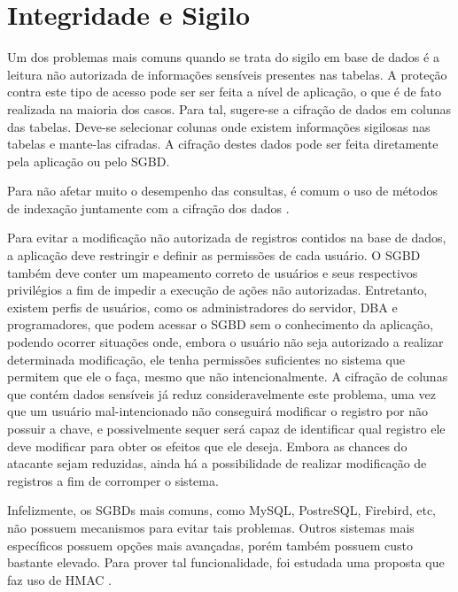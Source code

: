 \chapter{Integridade e Sigilo}


Um dos problemas mais comuns quando se trata do sigilo em base de dados \'{e} a leitura n\~{a}o autorizada de informa\c{c}\~{o}es sens\'{i}veis presentes nas tabelas.
A prote\c{c}\~{a}o contra este tipo de acesso pode ser ser feita a n\'{i}vel de aplica\c{c}\~{a}o, o que \'{e} de fato realizada na maioria dos casos.
Para tal, sugere-se a cifração de dados em colunas das tabelas.
Deve-se selecionar colunas onde existem informa\c{c}\~{o}es sigilosas nas tabelas e mante-las cifradas. A cifração destes dados pode ser feita diretamente pela aplica\c{c}\~{a}o
ou pelo \ac{SGBD}.

Para não afetar muito o desempenho das consultas, é comum o uso de métodos de indexação juntamente com a cifração dos dados \cite{samarati.encryption.2006, samarati.indexing.2003, hakan.indexing.2004}.

Para evitar a modificação não autorizada de registros contidos na base de dados, a aplicação deve restringir e definir as permissões de cada usuário.
O \ac{SGBD} também deve conter um mapeamento correto de usuários e seus respectivos privilégios a fim de impedir a execução de ações não autorizadas.
Entretanto, existem perfis de usuários, como os administradores do servidor, \ac{DBA} e programadores, que podem acessar o \ac{SGBD} sem o conhecimento da aplicação,
podendo ocorrer situações onde, embora o usuário não seja autorizado a realizar determinada modificação, ele tenha permissões suficientes no sistema que permitem que ele o faça, mesmo que não intencionalmente.
A cifração de colunas que contém dados sensíveis já reduz consideravelmente este problema, uma vez que um usuário mal-intencionado não conseguirá modificar o registro por não possuir a chave,
 e possivelmente sequer será capaz de identificar qual registro ele deve modificar para obter os efeitos que ele deseja. Embora as chances do atacante sejam reduzidas, ainda há a possibilidade de realizar modificação de registros 
 a fim de corromper o sistema.

Infelizmente, os \ac{SGBD}s mais comuns, como MySQL, PostreSQL, Firebird, etc, n\~{a}o possuem mecanismos para evitar tais problemas.
Outros sistemas mais espec\'{i}ficos possuem op\c{c}\~{o}es mais avan\c{c}adas, por\'{e}m também possuem custo bastante elevado.
Para prover tal funcionalidade, foi estudada uma proposta que faz uso de \ac{HMAC} \cite{Bellare:1996:KHF:646761.706031, rfc6151}.


